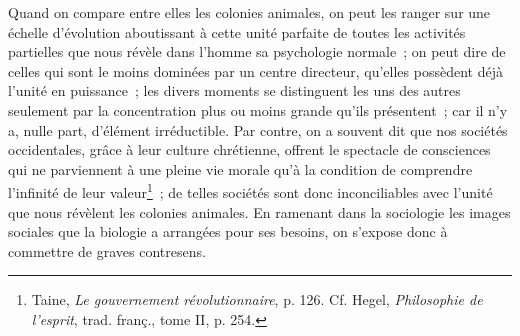 \documentclass[french,twoside]{book} %
\begin{document}
Quand on compare entre elles les colonies animales, on peut les ranger sur une échelle d’évolution aboutissant à cette unité parfaite de toutes les activités partielles que nous révèle dans l’homme sa psychologie normale ; on peut dire de celles qui sont le moins dominées par un centre directeur, qu’elles possèdent déjà l’unité en puissance ; les divers moments se distinguent les uns des autres seulement par la concentration plus ou moins grande qu’ils présentent ; car il n’y a, nulle part, d’élément irréductible. Par contre, on a souvent dit que nos sociétés occidentales, grâce à leur culture chrétienne, offrent le spectacle de consciences qui ne parviennent à une pleine vie morale qu’à la condition de comprendre l’infinité de leur valeur\footnote{ \noindent Taine, \emph{Le gouvernement révolutionnaire}, p. 126. Cf. Hegel, \emph{Philosophie de l’esprit}, trad. franç., tome II, p. 254.
 } ; de telles sociétés sont donc inconciliables avec l’unité que nous révèlent les colonies animales. En ramenant dans la sociologie les images sociales que la biologie a arrangées pour ses besoins, on s’expose donc à commettre de graves contresens.
\end{document}
